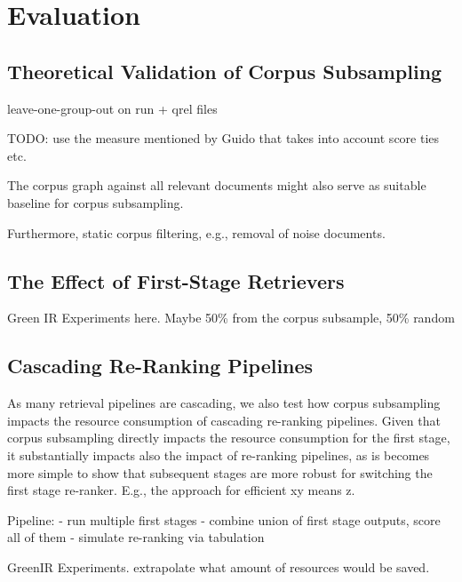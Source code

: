\section{Evaluation}

\subsection{Theoretical Validation of Corpus Subsampling}

leave-one-group-out on run + qrel files



{\color{red} TODO: use the measure mentioned by Guido that takes into account score ties etc.

The corpus graph against all relevant documents might also serve as suitable baseline for corpus subsampling.

Furthermore, static corpus filtering, e.g., removal of noise documents.
}

\subsection{The Effect of First-Stage Retrievers}

Green IR Experiments here.
Maybe 50\% from the corpus subsample, 50\% random

\subsection{Cascading Re-Ranking Pipelines}

As many retrieval pipelines are cascading, we also test how corpus subsampling impacts the resource consumption of cascading re-ranking pipelines. Given that corpus subsampling directly impacts the resource consumption for the first stage, it substantially impacts also the impact of re-ranking pipelines, as is becomes more simple to show that subsequent stages are more robust for switching the first stage re-ranker. E.g., the approach for efficient xy means z.

Pipeline:
- run multiple first stages
- combine union of first stage outputs, score all of them
- simulate re-ranking via tabulation

{\color{red} GreenIR Experiments. extrapolate what amount of resources would be saved.}
